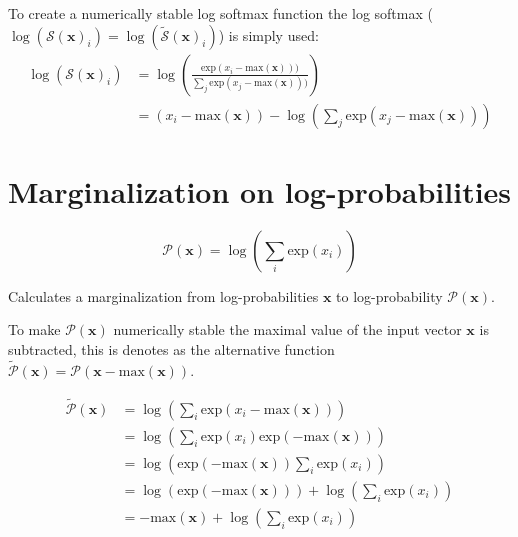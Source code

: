 To create a numerically stable log softmax function the log softmax ($\log(\mathcal{S}(\mathbf{x})_i) = \log(\tilde{\mathcal{S}}(\mathbf{x})_i)$) is simply used:
\begin{equation}
\begin{aligned}
\log(\mathcal{S}(\mathbf{x})_i) 
&= \log\left(\frac{\mathrm{exp}(x_i - \mathrm{max}(\mathbf{x})))}{\sum_j \mathrm{exp}(x_j - \mathrm{max}(\mathbf{x})))}\right) \\
&= (x_i - \mathrm{max}(\mathbf{x})) - \log\left(\sum_j \mathrm{exp}(x_j - \mathrm{max}(\mathbf{x}))\right)
\end{aligned}
\end{equation}

\section{Marginalization on log-probabilities}
\label{appendix:numerical-stability:log-sum-exp}

\begin{equationbox}[H]
\begin{equation*}
\mathcal{P}(\mathbf{x}) = \log\left(\sum_i \mathrm{exp}(x_i)\right)
\end{equation*}
\caption{Calculates a marginalization from log-probabilities $\mathbf{x}$ to log-probability $\mathcal{P}(\mathbf{x})$.}
\end{equationbox}

To make $\mathcal{P}(\mathbf{x})$ numerically stable the maximal value of the input vector $\mathbf{x}$ is subtracted, this is denotes as the alternative function $\tilde{\mathcal{P}}(\mathbf{x}) = \mathcal{P}(\mathbf{x} - \mathrm{max}(\mathbf{x}))$.

\begin{equation}
\begin{aligned}
\tilde{\mathcal{P}}(\mathbf{x}) &= \log\left(\sum_i \mathrm{exp}(x_i - \mathrm{max}(\mathbf{x}))\right) \\
&= \log\left(\sum_i \mathrm{exp}(x_i)\mathrm{exp}(- \mathrm{max}(\mathbf{x}))\right) \\
&= \log\left(\mathrm{exp}(- \mathrm{max}(\mathbf{x})) \sum_i \mathrm{exp}(x_i)\right) \\
&= \log(\mathrm{exp}(- \mathrm{max}(\mathbf{x}))) + \log\left(\sum_i \mathrm{exp}(x_i)\right) \\
&= - \mathrm{max}(\mathbf{x}) + \log\left(\sum_i \mathrm{exp}(x_i)\right)
\end{aligned}
\label{eq:appendix:numerical:log-sum-exp:lsx-mmax}
\end{equation}

